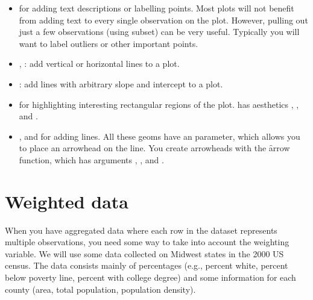 \begin{itemize}
  \item {} for adding text descriptions or labelling points.  Most plots will not benefit from adding text to every single observation on the plot.  However, pulling out just a few observations (using subset) can be very useful.  Typically you will want to label outliers or other important points.
  
  \item {}, : add vertical or horizontal lines to a plot.
  
  \item {}: add lines with arbitrary slope and intercept to a plot.
  
  \item {} for highlighting interesting rectangular regions of the plot.   has aesthetics , ,  and .
  
  \item {},  and  for adding lines.  All these geoms have an  parameter, which allows you to place an arrowhead on the line.  You create arrowheads with the \f{arrow} function, which has arguments , ,  and .
  
\end{itemize}


\section{Weighted data}
\label{sec:weighting}


When you have aggregated data where each row in the dataset represents multiple observations, you need some way to take into account the weighting variable.  We will use some data collected on Midwest states in the 2000 US census. The data consists mainly of percentages (e.g., percent white, percent below poverty line, percent with college degree) and some information for each county (area, total population, population density).

